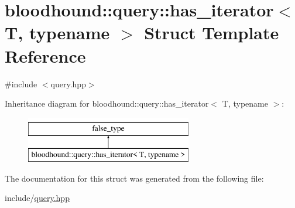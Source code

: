 \hypertarget{structbloodhound_1_1query_1_1has__iterator}{}\section{bloodhound\+:\+:query\+:\+:has\+\_\+iterator$<$ T, typename $>$ Struct Template Reference}
\label{structbloodhound_1_1query_1_1has__iterator}


{\ttfamily \#include $<$query.\+hpp$>$}

Inheritance diagram for bloodhound\+:\+:query\+:\+:has\+\_\+iterator$<$ T, typename $>$\+:\begin{figure}[H]
\begin{center}
\leavevmode
\includegraphics[height=2.000000cm]{structbloodhound_1_1query_1_1has__iterator}
\end{center}
\end{figure}


The documentation for this struct was generated from the following file\+:\begin{DoxyCompactItemize}
\item 
include/\hyperlink{query_8hpp}{query.\+hpp}\end{DoxyCompactItemize}
